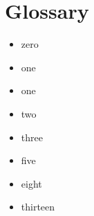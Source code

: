 \chapter{Glossary}\hypertarget{glossary}{}\label{glossary}

\begin{itemize}
\item zero
\item one
\item one
\item two
\item three
\item five
\item eight
\item thirteen
\end{itemize}

